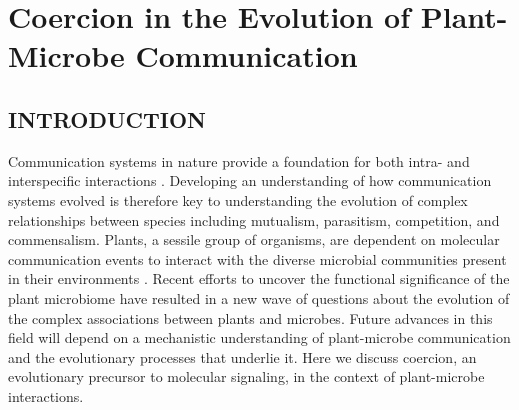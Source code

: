 
\chapter{Coercion in the Evolution of Plant-Microbe Communication}
\label{ch:chapter 1}
%
%
%


\section{INTRODUCTION} 
Communication systems in nature provide a foundation for both intra- and interspecific interactions \parencite{scott-phillips2008}. Developing an understanding of how communication systems evolved is therefore key to understanding the evolution of complex relationships between species including mutualism, parasitism, competition, and commensalism. Plants, a sessile group of organisms, are dependent on molecular communication events to interact with the diverse microbial communities present in their environments \parencite{baker1997}. Recent efforts to uncover the functional significance of the plant microbiome have resulted in a new wave of questions about the evolution of the complex associations between plants and microbes. Future advances in this field will depend on a mechanistic understanding of plant-microbe communication and the evolutionary processes that underlie it. Here we discuss coercion, an evolutionary precursor to molecular signaling, in the context of plant-microbe interactions.
